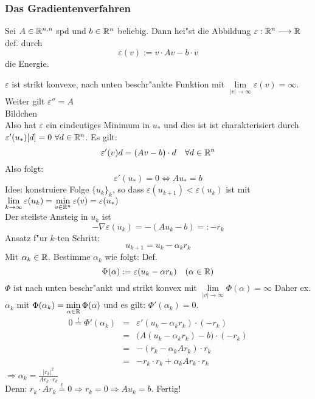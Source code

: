 \documentclass{scrartcl}
\begin{document}
\subsubsection{Das Gradientenverfahren}
\begin{Def}
Sei $A \in \mathbb{R}^{n,n}$ spd und $b \in \mathbb{R}^n$ beliebig. Dann hei"st die Abbildung $\varepsilon: \mathbb{R}^n \longrightarrow \mathbb{R}$ def. durch
$$ \varepsilon(v) := v\cdot A v - b\cdot v$$
die Energie.
\end{Def}
$\varepsilon$ ist strikt konvexe, nach unten beschr"ankte Funktion mit $\lim\limits_{\vert v \vert \rightarrow \infty} \varepsilon(v) = \infty$. Weiter gilt $\varepsilon'' = A$ \\
Bildchen \\
Also hat $\varepsilon$ ein eindeutiges Minimum in $u_*$ und dies ist ist charakterisiert durch $\varepsilon'(u_*)[d] = 0 \ \forall d \in \mathbb{R}^n$. Es gilt:
$$\varepsilon'(v) d = (Av - b) \cdot d \quad \forall d \in \mathbb{R}^{n}$$
Also folgt:
$$ \varepsilon'(u_*) = 0 \Leftrightarrow Au_* = b$$
Idee: konstruiere Folge $\{ u_k \}_k$, so dass $\varepsilon(u_{k+1}) < \varepsilon(u_k)$ ist mit $\lim\limits_{k \rightarrow \infty} \varepsilon(u_k) = \min\limits_{v \in \mathbb{R}^n} \varepsilon(v) = \varepsilon(u_*)$ \\
Der steilste Ansteig in $u_k$ ist 
$$ - \nabla \varepsilon(u_k) = - (Au_k - b) =: -r_k $$
Ansatz f"ur $k$-ten Schritt:
$$ u_{k+1} = u_k - \alpha_k r_k$$
Mit $\alpha_k \in \mathbb{R}$. Bestimme $\alpha_k$ wie folgt: Def.
$$ \Phi(\alpha) := \varepsilon(u_k - \alpha r_k) \quad (\alpha \in \mathbb{R})$$
$\Phi$ ist nach unten beschr"ankt und strikt konvex mit $\lim\limits_{\vert v \vert \rightarrow \infty} \Phi(\alpha) = \infty$
Daher ex. $\alpha_k$ mit $\Phi(\alpha_k) = \min\limits_{\alpha \in \mathbb{R}} \Phi(\alpha)$ und es gilt: $\Phi'(\alpha_k) = 0$.
\begin{eqnarray*}
0 \stackrel{!}{=} \Phi'(\alpha_k) & = & \varepsilon'(u_k - \alpha_k r_k) \cdot (-r_k) \\
& = & \big( A (u_k - \alpha_k r_k) - b \big) \cdot (-r_k) \\
& = & -( r_k - \alpha_k A r_k ) \cdot r_k \\
& = & - r_k \cdot r_k + \alpha_k A r_k \cdot r_k
\end{eqnarray*}
$\displaystyle \Rightarrow \alpha_k = \frac{\vert r_k \vert^2}{A r_k \cdot r_k}$ \\
Denn: $r_k \cdot A r_k \stackrel{!}{=} 0 \Rightarrow r_k = 0 \Rightarrow Au_k = b$. Fertig!
\end{document}
